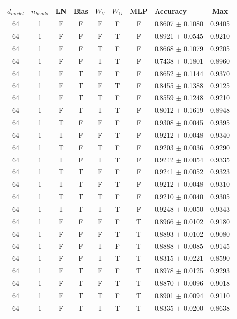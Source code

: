 \begin{tabular}{c c c c c c c l c}
\toprule
$d_{model}$ & $n_{heads}$ & LN & Bias & $W_V$ & $W_O$ & MLP & Accuracy & Max \\
\midrule
64 & 1 & F & F & F & F & F & 0.8607 $\pm$ 0.1080 & 0.9405 \\
\midrule
64 & 1 & F & F & F & T & F & 0.8921 $\pm$ 0.0545 & 0.9210 \\
64 & 1 & F & F & T & F & F & 0.8668 $\pm$ 0.1079 & 0.9205 \\
64 & 1 & F & F & T & T & F & 0.7438 $\pm$ 0.1801 & 0.8960 \\
64 & 1 & F & T & F & F & F & 0.8652 $\pm$ 0.1144 & 0.9370 \\
64 & 1 & F & T & F & T & F & 0.8455 $\pm$ 0.1388 & 0.9125 \\
64 & 1 & F & T & T & F & F & 0.8559 $\pm$ 0.1248 & 0.9210 \\
64 & 1 & F & T & T & T & F & 0.8012 $\pm$ 0.1619 & 0.8948 \\
64 & 1 & T & F & F & F & F & 0.9308 $\pm$ 0.0045 & 0.9395 \\
64 & 1 & T & F & F & T & F & 0.9212 $\pm$ 0.0048 & 0.9340 \\
64 & 1 & T & F & T & F & F & 0.9203 $\pm$ 0.0036 & 0.9290 \\
64 & 1 & T & F & T & T & F & 0.9242 $\pm$ 0.0054 & 0.9335 \\
64 & 1 & T & T & F & F & F & 0.9241 $\pm$ 0.0052 & 0.9323 \\
64 & 1 & T & T & F & T & F & 0.9212 $\pm$ 0.0048 & 0.9310 \\
64 & 1 & T & T & T & F & F & 0.9210 $\pm$ 0.0040 & 0.9305 \\
64 & 1 & T & T & T & T & F & 0.9248 $\pm$ 0.0050 & 0.9343 \\
64 & 1 & F & F & F & F & T & 0.8966 $\pm$ 0.0102 & 0.9180 \\
64 & 1 & F & F & F & T & T & 0.8893 $\pm$ 0.0102 & 0.9080 \\
64 & 1 & F & F & T & F & T & 0.8888 $\pm$ 0.0085 & 0.9145 \\
64 & 1 & F & F & T & T & T & 0.8315 $\pm$ 0.0221 & 0.8590 \\
64 & 1 & F & T & F & F & T & 0.8978 $\pm$ 0.0125 & 0.9293 \\
64 & 1 & F & T & F & T & T & 0.8870 $\pm$ 0.0096 & 0.9018 \\
64 & 1 & F & T & T & F & T & 0.8901 $\pm$ 0.0094 & 0.9110 \\
64 & 1 & F & T & T & T & T & 0.8335 $\pm$ 0.0200 & 0.8638 \\

\end{tabular}
